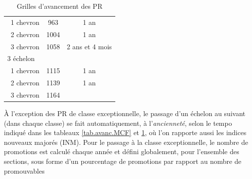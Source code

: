 \begin{center}
\begin{table}[t!]
\begin{center}
{\begin{tabular}{lcc}
~\hspace{1cm}1\ier{} chevron &963&1 an\\
~\hspace{1cm}2\ieme{} chevron &1004&1 an\\
~\hspace{1cm}3\ieme{} chevron &1058&2 ans et 4 mois \\
3\ieme{} \'echelon & &  \\
~\hspace{1cm}1\ier{} chevron &1115&1 an\\
~\hspace{1cm}2\ieme{} chevron &1139&1 an\\
~\hspace{1cm}3\ieme{} chevron &1164& \\
\bottomrule
\end{tabular}
}

\caption{Grilles d'avancement des PR}\label{tab.avanc.PR}
\end{center}
\end{table}
\end{center}




\`A l'exception des PR de classe exceptionnelle,
le passage d'un \'echelon au suivant (dans chaque classe) se fait
automatiquement, \`a l'{\em anciennet\'e}, selon le tempo indiqu\'e
dans les tableaux \ref{tab.avanc.MCF} et \ref{tab.avanc.PR}, o\`u l'on rapporte aussi les indices
nouveaux major\'es (INM). Pour le passage \`a la classe exceptionnelle, le nombre de promotions est calcul\'e chaque ann\'ee et d\'efini globalement, pour l'ensemble des sections, sous forme d'un pourcentage de promotions par rapport au nombre de \og promouvables\fg{} 

